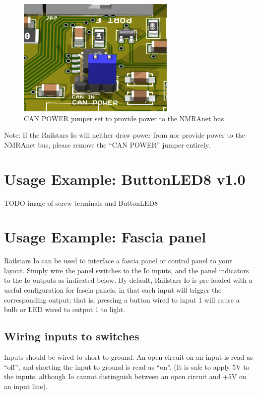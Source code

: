 \documentclass[12pt]{book}
\begin{document}
\begin{figure}[htbp]
\begin{center}
\includegraphics[width=3in]{images/IoCANPowerOut.png}
\caption{CAN POWER jumper set to provide power to the NMRAnet bus}
\label{CANOUT}
\end{center}
\end{figure}

Note: If the Railstars Io will neither draw power from nor provide power to the NMRAnet bus, please remove the ``CAN POWER'' jumper entirely.

\section{Usage Example: ButtonLED8 v1.0}

TODO image of screw terminals and ButtonLED8

\section{Usage Example: Fascia panel}

Railstars Io can be used to interface a fascia panel or control panel to your layout. Simply wire the panel switches to the Io inputs, and the panel indicators to the Io outputs as indicated below. By default, Railstars Io is pre-loaded with a useful configuration for fascia panels, in that each input will trigger the corresponding output; that is, pressing a button wired to input 1 will cause a bulb or LED wired to output 1 to light.

\subsection{Wiring inputs to switches}

Inputs should be wired to short to ground. An open circuit on an input is read as ``off'', and shorting the input to ground is read as ``on''. (It is safe to apply 5V to the inputs, although Io cannot distinguish between an open circuit and +5V on an input line).
\end{document}
